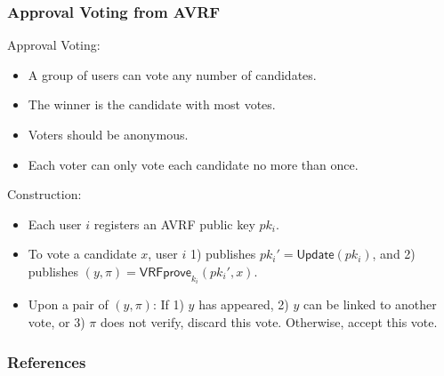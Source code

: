 \documentclass{beamer}
\begin{document}
\begin{frame}
\frametitle{Approval Voting from AVRF}

Approval Voting:
\begin{itemize}
    \item A group of users can vote any number of candidates.
    \item The winner is the candidate with most votes.
    \item Voters should be anonymous.
    \item Each voter can only vote each candidate no more than once.
\end{itemize}

Construction:
\begin{itemize}
    \item Each user $i$ registers an AVRF public key $pk_i$.
    \item To vote a candidate $x$, user $i$ 1) publishes $pk_i' = \mathsf{Update}(pk_i)$, and 2) publishes $(y, \pi) = \mathsf{VRFprove}_{k_i}(pk_i', x)$.
    \item Upon a pair of $(y, \pi)$: If 1) $y$ has appeared, 2) $y$ can be linked to another vote, or 3) $\pi$ does not verify, discard this vote. Otherwise, accept this vote.
\end{itemize}

\end{frame}

\begin{frame}[allowframebreaks]
    \frametitle{References}
    
    \tiny
\end{frame}
\end{document}
